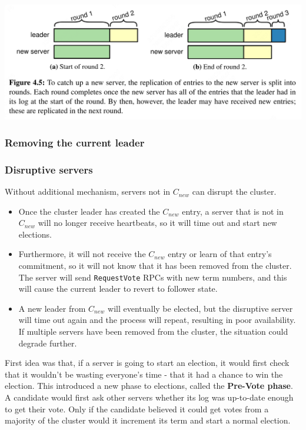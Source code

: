 \documentclass[11pt]{article}
\begin{document}
\begin{center}
\includegraphics[width=.99\textwidth]{../../images/papers/19.png}
\label{4.5}
\end{center}
\subsubsection{Removing the current leader}
\label{sec:orgac8cb1e}
\subsubsection{Disruptive servers}
\label{sec:orgebde0c5}
Without additional mechanism, servers not in \(C_{new}\) can disrupt the cluster.
\begin{itemize}
\item Once the cluster leader has created the \(C_{new}\) entry, a server that is not in \(C_{new}\) will
no longer receive heartbeats, so it will time out and start new elections.
\item Furthermore, it will not receive the \(C_{new}\) entry or learn of that entry’s commitment, so it
will not know that it has been removed from the cluster. The server will send \texttt{RequestVote} RPCs with
new term numbers, and this will cause the current leader to revert to follower state.
\item A new leader from \(C_{new}\) will eventually be elected, but the disruptive server will time out
again and the process will repeat, resulting in poor availability. If multiple servers have been
removed from the cluster, the situation could degrade further.
\end{itemize}


First idea was that, if a server is going to start an election, it would first check that it wouldn't
be wasting everyone's time - that it had a chance to win the election. This introduced a new phase to
elections, called the \textbf{Pre-Vote phase}. A candidate would first ask other servers whether its log was
up-to-date enough to get their vote. Only if the candidate believed it could get votes from a majority
of the cluster would it increment its term and start a normal election.
\end{document}
